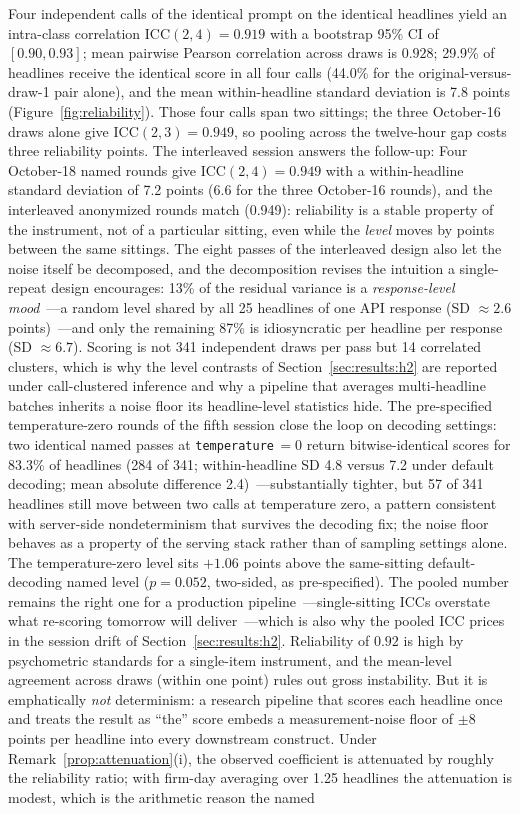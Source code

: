 Four independent calls of the identical prompt on the identical headlines yield an intra-class correlation $\text{ICC}(2,4)=0.919$ with a bootstrap 95\% CI of $[0.90, 0.93]$; mean pairwise Pearson correlation across draws is $0.928$; 29.9\% of headlines receive the identical score in all four calls (44.0\% for the original-versus-draw-1 pair alone), and the mean within-headline standard deviation is 7.8 points (Figure~\ref{fig:reliability}). Those four calls span two sittings; the three October-16 draws alone give $\text{ICC}(2,3)=0.949$, so pooling across the twelve-hour gap costs three reliability points. The interleaved session answers the follow-up: Four October-18 named rounds give $\text{ICC}(2,4)=0.949$ with a within-headline standard deviation of 7.2 points (6.6 for the three October-16 rounds), and the interleaved anonymized rounds match (0.949): reliability is a stable property of the instrument, not of a particular sitting, even while the \emph{level} moves by points between the same sittings. The eight passes of the interleaved design also let the noise itself be decomposed, and the decomposition revises the intuition a single-repeat design encourages: 13\% of the residual variance is a \emph{response-level mood}~---a random level shared by all 25 headlines of one API response (SD $\approx2.6$ points)~---and only the remaining 87\% is idiosyncratic per headline per response (SD $\approx6.7$). Scoring is not 341 independent draws per pass but 14 correlated clusters, which is why the level contrasts of Section~\ref{sec:results:h2} are reported under call-clustered inference and why a pipeline that averages multi-headline batches inherits a noise floor its headline-level statistics hide. The pre-specified temperature-zero rounds of the fifth session close the loop on decoding settings: two identical named passes at \texttt{temperature}$\,=0$ return bitwise-identical scores for 83.3\% of headlines (284 of 341; within-headline SD 4.8 versus 7.2 under default decoding; mean absolute difference 2.4)~---substantially tighter, but 57 of 341 headlines still move between two calls at temperature zero, a pattern consistent with server-side nondeterminism that survives the decoding fix; the noise floor behaves as a property of the serving stack rather than of sampling settings alone. The temperature-zero level sits $+1.06$ points above the same-sitting default-decoding named level ($p=0.052$, two-sided, as pre-specified). The pooled number remains the right one for a production pipeline~---single-sitting ICCs overstate what re-scoring tomorrow will deliver~---which is also why the pooled ICC prices in the session drift of Section~\ref{sec:results:h2}. Reliability of $0.92$ is high by psychometric standards for a single-item instrument, and the mean-level agreement across draws (within one point) rules out gross instability. But it is emphatically \emph{not} determinism: a research pipeline that scores each headline once and treats the result as ``the'' score embeds a measurement-noise floor of $\pm8$ points per headline into every downstream construct. Under Remark~\ref{prop:attenuation}(i), the observed coefficient is attenuated by roughly the reliability ratio; with firm-day averaging over 1.25 headlines the attenuation is modest, which is the arithmetic reason the named 